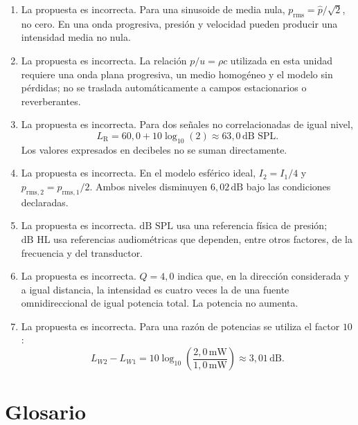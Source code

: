 \begin{enumerate}[label=\textbf{D\arabic*.},leftmargin=*]
    \item La propuesta es incorrecta. Para una sinusoide de media nula,
    \(p_\mathrm{rms}=\hat p/\sqrt{2}\), no cero. En una onda progresiva,
    presión y velocidad pueden producir una intensidad media no nula.

    \item La propuesta es incorrecta. La relación
    \(p/u=\rho c\) utilizada en esta unidad requiere una onda plana progresiva,
    un medio homogéneo y el modelo sin pérdidas; no se traslada
    automáticamente a campos estacionarios o reverberantes.

    \item La propuesta es incorrecta. Para dos señales no correlacionadas de
    igual nivel,
    \[
        L_\mathrm{R}
          =60{,}0+10\log_{10}(2)
          \approx63{,}0\,\text{dB SPL}.
    \]
    Los valores expresados en decibeles no se suman directamente.

    \item La propuesta es incorrecta. En el modelo esférico ideal,
    \(I_2=I_1/4\) y
    \(p_{\mathrm{rms},2}=p_{\mathrm{rms},1}/2\). Ambos niveles disminuyen
    \(6{,}02\,\text{dB}\) bajo las condiciones declaradas.

    \item La propuesta es incorrecta. \(\text{dB SPL}\) usa una referencia
    física de presión; \(\text{dB HL}\) usa referencias audiométricas que
    dependen, entre otros factores, de la frecuencia y del transductor.

    \item La propuesta es incorrecta. \(Q=4{,}0\) indica que, en la dirección
    considerada y a igual distancia, la intensidad es cuatro veces la de una
    fuente omnidireccional de igual potencia total. La potencia no aumenta.

    \item La propuesta es incorrecta. Para una razón de potencias se utiliza
    el factor \(10\):
    \[
        L_{W2}-L_{W1}
          =10\log_{10}\!\left(
            \frac{2{,}0\,\text{mW}}{1{,}0\,\text{mW}}\right)
          \approx3{,}01\,\text{dB}.
    \]
\end{enumerate}

\section{Glosario}
\label{sec:u4-glosario}

